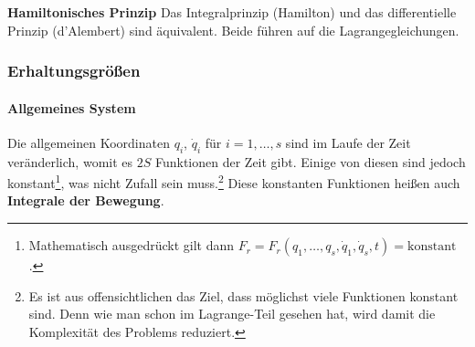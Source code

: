 \documentclass[oneside]{book}
\theoremstyle{definition}
\begin{document}
\textbf{Hamiltonisches Prinzip}
Das Integralprinzip (Hamilton) und das differentielle Prinzip (d'Alembert) sind äquivalent. Beide führen auf die Lagrangegleichungen. 

\subsubsection{Erhaltungsgrößen}
\paragraph{Allgemeines System} Die allgemeinen Koordinaten $q_i$, $\dot{q}_i$ für $i = 1, \dots, s$ sind im Laufe der Zeit veränderlich, womit es $2S$ Funktionen der Zeit gibt. Einige von diesen sind jedoch konstant\footnote{Mathematisch ausgedrückt gilt dann $F_r = F_r(q_1, \dots, q_s, \dot{q}_1, \dot{q}_s, t) = \text{konstant}$.}, was nicht Zufall sein muss.\footnote{Es ist aus offensichtlichen das Ziel, dass möglichst viele Funktionen konstant sind. Denn wie man schon im Lagrange-Teil gesehen hat, wird damit die Komplexität des Problems reduziert.}
Diese konstanten Funktionen heißen auch \textbf{Integrale der Bewegung}.
\end{document}
